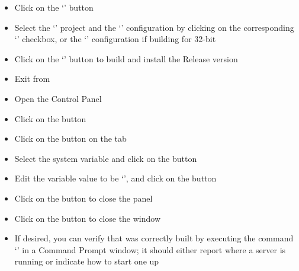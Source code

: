 \begin{itemize}
\item\exSp{}Click on the `' button
\item\exSp{}Select the `' project and the `'
configuration by clicking on the corresponding `' checkbox, or the
`' configuration if building for 32-bit
\item\exSp{}Click on the `' button to build and install the Release version
\item\exSp{}Exit from 
\item\exSp{}Open the  Control Panel
\item\exSp{}Click on the  button
\item\exSp{}Click on the  button on the 
tab
\item\exSp{}Select the  system variable and click on the
 button 
\item\exSp{}Edit the variable value to be
`', and click on the 
button
\item\exSp{}Click on the  button to close the 
panel
\item\exSp{}Click on the  button to close the 
window
\item\exSp{}If desired, you can verify that \yarp{} was correctly built by executing the
command `' in a Command Prompt window; it should either report where a
\yarp{} server is running or indicate how to start one up
\end{itemize}
\tertiaryEnd
{}
